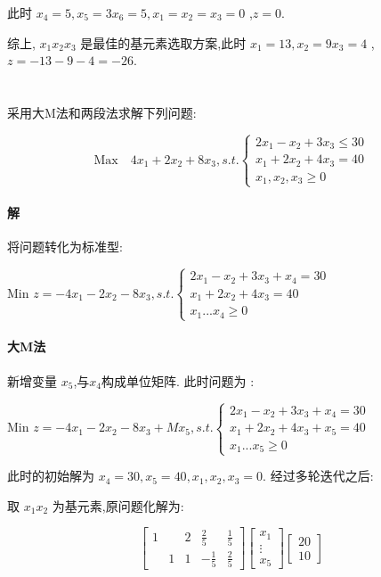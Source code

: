 \documentclass[a4paper]{article}
\begin{document}
此时 $x_4 = 5 , x_5 = 3 x_6 = 5, x_1 = x_2 = x_3 = 0$ ,$z = 0$.


综上, $x_1x_2x_3$ 是最佳的基元素选取方案,此时 $x_1 = 13 , x_2 = 9 x_3 = 4$ ,$z = -13-9-4 = -26$.
\section{}
采用大M法和两段法求解下列问题:

\[\text{Max}\quad 4x_1 + 2x_2 + 8x_3, s.t. \left\{\begin{aligned}
    2x_1 - x_2 + 3x_3 \leq 30 \\
    x_1 + 2x_2 + 4x_3 = 40\\
    x_1,x_2,x_3 \geq 0
\end{aligned}\right.\]

\paragraph{解}
   将问题转化为标准型:

Min \(z=-4x_1-2x_2-8x_3 , s.t. \left\{\begin{aligned}
  2x_1-x_2+3x_3+x_4=30 \\
  x_1+2x_2+4x_3=40 \\
x_1  ... x_4 \geq 0
\end{aligned}\right.\)

\paragraph{大M法}

新增变量 \(x_5\),与\(x_4\)构成单位矩阵. 此时问题为 :

Min \(z=-4x_1-2x_2-8x_3 + Mx_5 , s.t. \left\{\begin{aligned}
  2x_1-x_2+3x_3+x_4=30 \\
  x_1+2x_2+4x_3 + x_5=40 \\
x_1  ... x_5 \geq 0
\end{aligned}\right.\)

此时的初始解为 $x_4 = 30, x_5 = 40, x_1,x_2,x_3 = 0$. 经过多轮迭代之后:

取 $x_1x_2$ 为基元素,原问题化解为:

\[
\begin{bmatrix}
1 &   & 2 & \frac{2}{5} & \frac{1}{5}  \\
  & 1 & 1 & -\frac{1}{5} & \frac{2}{5} 
\end{bmatrix}
\begin{bmatrix}
    x_1 \\ \vdots \\  x_5
\end{bmatrix} 
\begin{bmatrix}
    20 \\ 10
\end{bmatrix} 
\]
\end{document}

